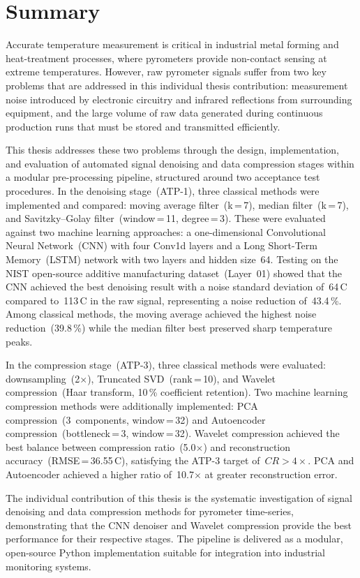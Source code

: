 \section*{Summary}
\vspace{-2ex}\titlerule\vspace{4ex}

Accurate temperature measurement is critical in industrial metal forming and heat-treatment processes, where pyrometers provide non-contact sensing at extreme temperatures. However, raw pyrometer signals suffer from two key problems that are addressed in this individual thesis contribution: measurement noise introduced by electronic circuitry and infrared reflections from surrounding equipment, and the large volume of raw data generated during continuous production runs that must be stored and transmitted efficiently.

This thesis addresses these two problems through the design, implementation, and evaluation of automated signal denoising and data compression stages within a modular pre-processing pipeline, structured around two acceptance test procedures. In the denoising stage~(ATP-1), three classical methods were implemented and compared: moving average filter~(k\,=\,7), median filter~(k\,=\,7), and Savitzky--Golay filter~(window\,=\,11, degree\,=\,3). These were evaluated against two machine learning approaches: a one-dimensional Convolutional Neural Network~(CNN) with four Conv1d layers and a Long Short-Term Memory~(LSTM) network with two layers and hidden size~64. Testing on the NIST open-source additive manufacturing dataset~(Layer~01) showed that the CNN achieved the best denoising result with a noise standard deviation of~64\,\textdegree C compared to~113\,\textdegree C in the raw signal, representing a noise reduction of~43.4\,\%. Among classical methods, the moving average achieved the highest noise reduction~(39.8\,\%) while the median filter best preserved sharp temperature peaks.

In the compression stage~(ATP-3), three classical methods were evaluated: downsampling~(2$\times$), Truncated SVD~(rank\,=\,10), and Wavelet compression~(Haar transform, 10\,\% coefficient retention). Two machine learning compression methods were additionally implemented: PCA compression~(3~components, window\,=\,32) and Autoencoder compression~(bottleneck\,=\,3, window\,=\,32). Wavelet compression achieved the best balance between compression ratio~(5.0$\times$) and reconstruction accuracy~(RMSE\,=\,36.55\,\textdegree C), satisfying the ATP-3 target of~$CR > 4\times$. PCA and Autoencoder achieved a higher ratio of~10.7$\times$ at greater reconstruction error.

The individual contribution of this thesis is the systematic investigation of signal denoising and data compression methods for pyrometer time-series, demonstrating that the CNN denoiser and Wavelet compression provide the best performance for their respective stages. The pipeline is delivered as a modular, open-source Python implementation suitable for integration into industrial monitoring systems.
